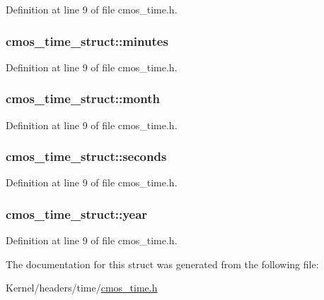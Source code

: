 Definition at line 9 of file cmos\_\-time.h.

\hypertarget{structcmos__time__struct_a62376ca5b28b9516726695f752656c35}{
\subsubsection[{minutes}]{ {\bf cmos\_\-time\_\-struct::minutes}}}
\label{structcmos__time__struct_a62376ca5b28b9516726695f752656c35}


Definition at line 9 of file cmos\_\-time.h.

\hypertarget{structcmos__time__struct_a2821680d4b9916ca33da7bfa156b5508}{
\subsubsection[{month}]{ {\bf cmos\_\-time\_\-struct::month}}}
\label{structcmos__time__struct_a2821680d4b9916ca33da7bfa156b5508}


Definition at line 9 of file cmos\_\-time.h.

\hypertarget{structcmos__time__struct_a528b763d67872f0b15849a877388a589}{
\subsubsection[{seconds}]{ {\bf cmos\_\-time\_\-struct::seconds}}}
\label{structcmos__time__struct_a528b763d67872f0b15849a877388a589}


Definition at line 9 of file cmos\_\-time.h.

\hypertarget{structcmos__time__struct_a0e0a1d380a057c948bf50ed24ac89f78}{
\subsubsection[{year}]{ {\bf cmos\_\-time\_\-struct::year}}}
\label{structcmos__time__struct_a0e0a1d380a057c948bf50ed24ac89f78}


Definition at line 9 of file cmos\_\-time.h.



The documentation for this struct was generated from the following file:\begin{DoxyCompactItemize}
\item 
Kernel/headers/time/\hyperlink{cmos__time_8h}{cmos\_\-time.h}\end{DoxyCompactItemize}
